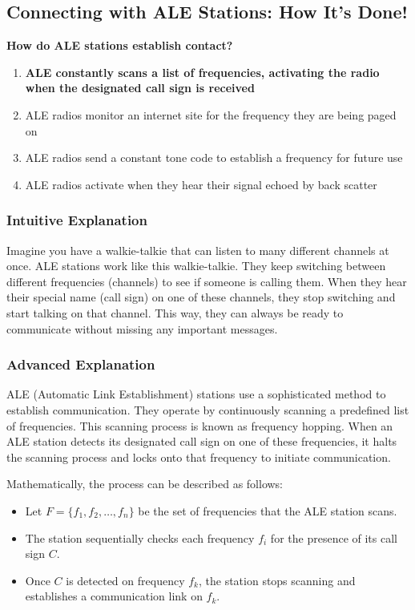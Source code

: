 \subsection{Connecting with ALE Stations: How It's Done!}
\label{subsec:E2E12}

\begin{tcolorbox}[colback=gray!10!white,colframe=black!75!black,title=\textbf{E2E12}]
\textbf{How do ALE stations establish contact?}
\begin{enumerate}[label=\Alph*.]
    \item \textbf{ALE constantly scans a list of frequencies, activating the radio when the designated call sign is received}
    \item ALE radios monitor an internet site for the frequency they are being paged on
    \item ALE radios send a constant tone code to establish a frequency for future use
    \item ALE radios activate when they hear their signal echoed by back scatter
\end{enumerate}
\end{tcolorbox}

\subsubsection{Intuitive Explanation}
Imagine you have a walkie-talkie that can listen to many different channels at once. ALE stations work like this walkie-talkie. They keep switching between different frequencies (channels) to see if someone is calling them. When they hear their special name (call sign) on one of these channels, they stop switching and start talking on that channel. This way, they can always be ready to communicate without missing any important messages.

\subsubsection{Advanced Explanation}
ALE (Automatic Link Establishment) stations use a sophisticated method to establish communication. They operate by continuously scanning a predefined list of frequencies. This scanning process is known as frequency hopping. When an ALE station detects its designated call sign on one of these frequencies, it halts the scanning process and locks onto that frequency to initiate communication. 

Mathematically, the process can be described as follows:
\begin{itemize}
    \item Let \( F = \{f_1, f_2, \dots, f_n\} \) be the set of frequencies that the ALE station scans.
    \item The station sequentially checks each frequency \( f_i \) for the presence of its call sign \( C \).
    \item Once \( C \) is detected on frequency \( f_k \), the station stops scanning and establishes a communication link on \( f_k \).
\end{itemize}

